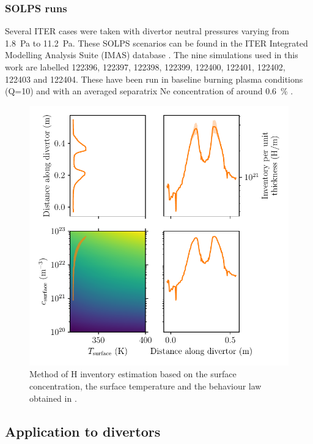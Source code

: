 \subsubsection{SOLPS runs}
Several ITER cases were taken with divertor neutral pressures varying from \SI{1.8}{Pa} to \SI{11.2}{Pa}.
These SOLPS  scenarios can be found in the ITER Integrated Modelling Analysis Suite (IMAS) database .
The nine simulations used in this work are labelled 122396, 122397, 122398, 122399, 122400, 122401, 122402, 122403 and 122404.
These have been run in baseline burning plasma conditions (Q=10) and with an averaged separatrix Ne concentration of around \SI{0.6}{\%} .


\begin{figure}[h!]
    \centering
    \includegraphics[width=\linewidth]{Figures/divertor/example.pdf}
    \caption{Method of H inventory estimation based on the surface concentration, the surface temperature and the behaviour law obtained in \cite{delaporte-mathurin_parametric_2020}.}
    \label{fig: behaviour law example}
\end{figure}

\subsection{Application to divertors}

